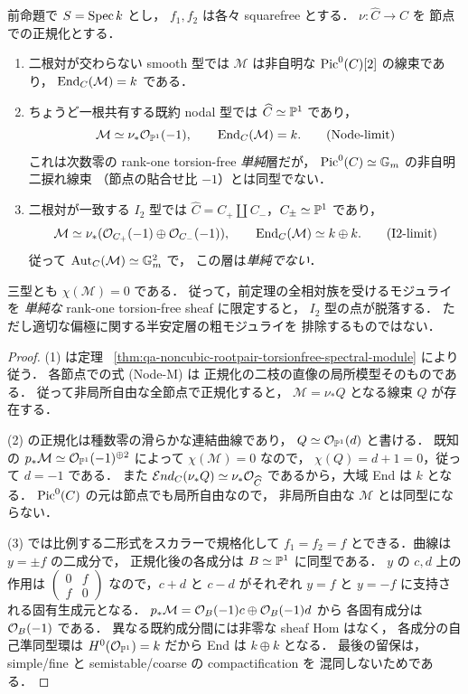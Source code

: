 \begin{theorem}
\label{thm:qa-spectral-three-fiber-limits}
前命題で $S=\operatorname{Spec} k$ とし，
$f_1,f_2$ は各々 squarefree とする．
$\nu:\widehat C\to C$ を
節点での正規化とする．
\begin{enumerate}
\item 二根対が交わらない smooth 型では
  $\mathcal M$ は非自明な $\operatorname{Pic}^0(C)[2]$ の線束であり，
  $\operatorname{End}_C(\mathcal M)=k$ である．
\item ちょうど一根共有する既約 nodal 型では
  $\widehat C\simeq\mathbb P^1$ であり，
  \[
       \mathcal M\simeq\nu_*\mathcal O_{\mathbb P^1}(-1),
       \qquad \operatorname{End}_C(\mathcal M)=k .
       \tag{Node-limit}\label{eq:qa-spectral-nodal-limit}
  \]
  これは次数零の rank-one torsion-free \emph{単純}層だが，
  $\operatorname{Pic}^0(C)\simeq\mathbb G_m$ の非自明二捩れ線束
  （節点の貼合せ比 $-1$）とは同型でない．
\item 二根対が一致する $I_2$ 型では
  $\widehat C=C_+\amalg C_-$，$C_\pm\simeq\mathbb P^1$ であり，
  \[
       \mathcal M\simeq
       \nu_*(\mathcal O_{C_+}(-1)\oplus\mathcal O_{C_-}(-1)),
       \qquad \operatorname{End}_C(\mathcal M)\simeq k\oplus k .
       \tag{I2-limit}\label{eq:qa-spectral-i2-limit}
  \]
  従って $\operatorname{Aut}_C(\mathcal M)\simeq\mathbb G_m^2$ で，
  この層は\emph{単純でない}．
\end{enumerate}
三型とも $\chi(\mathcal M)=0$ である．
従って，前定理の全相対族を受けるモジュライを
\emph{単純な} rank-one torsion-free sheaf に限定すると，
$I_2$ 型の点が脱落する．
ただし適切な偏極に関する半安定層の粗モジュライを
排除するものではない．
\end{theorem}
\begin{proof}
(1) は定理
~\ref{thm:qa-noncubic-rootpair-torsionfree-spectral-module}
により従う．
各節点での式 (Node-M) は
正規化の二枝の直像の局所模型そのものである．
従って非局所自由な全節点で正規化すると，
$\mathcal M=\nu_*Q$ となる線束 $Q$ が存在する．

(2) の正規化は種数零の滑らかな連結曲線であり，
$Q\simeq\mathcal O_{\mathbb P^1}(d)$ と書ける．
既知の
$p_*\mathcal M\simeq\mathcal O_{\mathbb P^1}(-1)^{\oplus2}$
によって $\chi(\mathcal M)=0$ なので，
$\chi(Q)=d+1=0$，従って $d=-1$ である．
また
$\mathcal E nd_C(\nu_*Q)\simeq\nu_*\mathcal O_{\widehat C}$
であるから，大域 End は $k$ となる．
$\operatorname{Pic}^0(C)$ の元は節点でも局所自由なので，
非局所自由な $\mathcal M$ とは同型にならない．

(3) では比例する二形式をスカラーで規格化して
$f_1=f_2=f$ とできる．曲線は $y=\pm f$ の二成分で，
正規化後の各成分は $B\simeq\mathbb P^1$ に同型である．
$y$ の $c,d$ 上の作用は
$\left(\begin{smallmatrix}0&f\\f&0\end{smallmatrix}\right)$
なので，$c+d$ と $c-d$ がそれぞれ
$y=f$ と $y=-f$ に支持される固有生成元となる．
$p_*\mathcal M=\mathcal O_B(-1)c\oplus\mathcal O_B(-1)d$ から
各固有成分は $\mathcal O_B(-1)$ である．
異なる既約成分間には非零な sheaf Hom はなく，
各成分の自己準同型環は $H^0(\mathcal O_{\mathbb P^1})=k$ だから
End は $k\oplus k$ となる．
最後の留保は，simple/fine と
semistable/coarse の compactification を
混同しないためである．
\end{proof}


